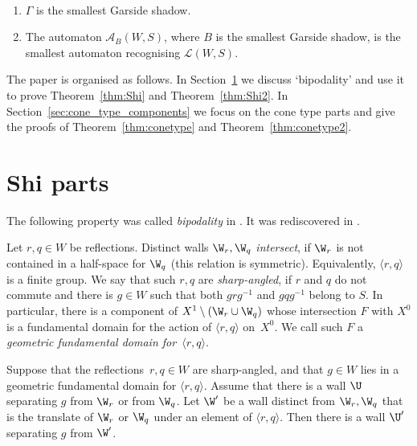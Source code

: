 \begin{coro} \,
	\begin{enumerate}[label=\roman*)]
		\item $\Gamma$ is the smallest Garside shadow.
		\item The automaton $\mathcal A_B(W,S)$, where $B$ is the smallest Garside shadow, is 
		the smallest automaton recognising $\mathcal{L}(W,S)$.
	\end{enumerate}
\end{coro}


The paper is organised as follows. In Section~\ref{sec:shi_components} we discuss `bipodality' and use it to prove Theorem~\ref{thm:Shi} and Theorem~\ref{thm:Shi2}. In Section~\ref{sec:cone_type_components} we focus on the cone type parts and give the proofs of Theorem~\ref{thm:conetype} and Theorem~\ref{thm:conetype2}.

\section{Shi parts}
\label{sec:shi_components}

The following property was called \emph{bipodality} in \cite{DH}. It was rediscovered in \cite{OP}.

\begin{defi} Let $r,q\in W$ be reflections. Distinct walls $\W_r,\W_{q}$ \emph{intersect}, if $\W_r$ is not contained in a half-space
	for $\W_{q}$ (this relation is symmetric). Equivalently, $\langle r,q\rangle$ is a finite group. We say that such $r,q$ are
	\emph{sharp-angled}, if $r$ and $q$ do not commute and there is $g\in W$ such that both $grg^{-1}$ and $gqg^{-1}$ belong to $S$. In particular, there is a component of $X^1\setminus (\W_r\cup
	\W_q)$ whose intersection $F$ with $X^0$ is a fundamental domain for the action of $\langle r,q\rangle$ on~$X^0$. We call such $F$ a \emph{geometric fundamental domain for~$\langle r,q\rangle$}.
\end{defi}

\begin{lemm}
	\label{lem:key} Suppose that the reflections~$r,q\in W$ are sharp-angled, and that $g\in W$ lies in a geometric fundamental domain for $\langle
	r,q\rangle$. Assume that there is a wall $\U$ separating $g$ from $\W_r$ or from $\W_q$. Let $\W'$ be a wall distinct from $\W_r,\W_q$ that is the
	translate of $\W_r$ or $\W_q$ under an element of $\langle r,q\rangle$. Then there is a wall $\U'$ separating $g$ from $\W'$.
\end{lemm}

